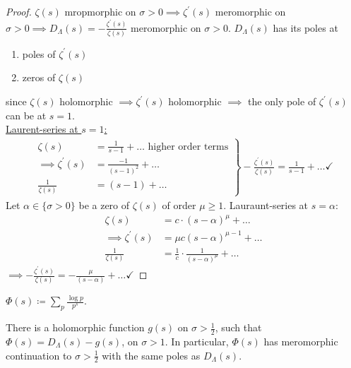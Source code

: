 \documentclass[NumTh.tex]{subfiles}
\begin{document}
\begin{proof}
  $\zeta(s)$ mropmorphic on $\sigma > 0 \implies \zeta^\prime(s)$ meromorphic on $\sigma > 0 \implies D_\Lambda(s) = - \frac{\zeta^\prime(s)}{\zeta(s)}$ meromorphic on $\sigma > 0$.
  $D_\Lambda(s)$ has its poles at
  \begin{enumerate}
    \item poles of $\zeta^\prime(s)$
    \item zeros of $\zeta(s)$
  \end{enumerate}
  since $\zeta(s)$ holomorphic $\implies \zeta^\prime(s)$ holomorphic $\implies$ the only pole of $\zeta^\prime(s)$ can be at $s = 1$.\\
  \underline{Laurent-series at $s=1$:}
  \begin{align*}
    \left.
    \begin{array}{ll}
    \zeta(s) &= \frac{1}{s-1} + \dots \text{ higher order terms} \\
    \implies \zeta^\prime(s) &= \frac{-1}{(s-1)^2} + \dots \\
    \frac{1}{\zeta(s)} &= (s-1) + \dots
    \end{array}
    \right\rbrace -\frac{\zeta^\prime(s)}{\zeta(s)} = \frac{1}{s-1} + \dots \checkmark
  \end{align*}
  Let $\alpha \in \{ \sigma >0\}$ be a zero of $\zeta(s)$ of order $\mu \geq 1$.
  Lauraunt-series at $s = \alpha$:\\
  \begin{align*}
    \zeta(s) &= c \cdot (s- \alpha)^\mu + \dots \\
    \implies \zeta^\prime(s) &= \mu c (s-\alpha)^{\mu - 1} + \dots \\
    \frac{1}{\zeta(s)} &= \frac{1}{c} \cdot \frac{1}{(s-\alpha)^\mu} + \dots
  \end{align*}
  $\implies - \frac{\zeta^\prime(s)}{\zeta(s)} = - \frac{\mu}{(s - \alpha)} + \dots \checkmark$
\end{proof}

\begin{defi}\label{4_13}
  $\Phi(s) \coloneq \sum_p \frac{\log p}{p^s}$.
\end{defi}

\begin{lemma}\label{4_14}
  There is a holomorphic function $g(s)$ on $\sigma > \frac{1}{2}$, such that $\Phi(s) = D_\Lambda(s) - g(s)$, on $\sigma > 1$.
  In particular, $\Phi(s)$ has meromorphic continuation to $\sigma > \frac{1}{2}$ with the same poles as $D_\Lambda(s)$.
\end{lemma}
\end{document}

